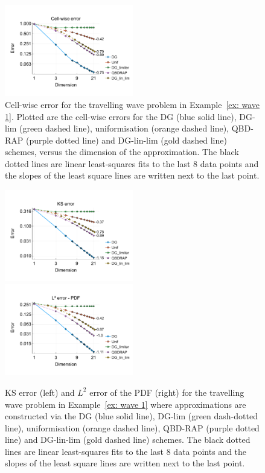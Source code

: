 \begin{example}
	\begin{figure}[h]
		\centering
		\includegraphics[width=0.5\textwidth,trim={0.75cm 0.8cm 0.25cm 1.25cm},clip]{chapter6/figs/wave/fun1/L1_cell_probs.pdf} 
		\caption{Cell-wise error for the travelling wave problem in Example~\ref{ex: wave 1}. Plotted are the cell-wise errors for the DG (blue solid line), DG-lim (green dashed line), uniformisation (orange dashed line), QBD-RAP (purple dotted line) and DG-lin-lim (gold dashed line) schemes, versus the dimension of the approximation. The black dotted lines are linear least-squares fits to the last 8 data points and the slopes of the least square lines are written next to the last point.}  
		\label{fig: fun 1 wave cp}  
	\end{figure}
	\begin{figure}[h]
		\centering
		\includegraphics[width=0.5\textwidth,trim={0.75cm 0.8cm 0.25cm 1.25cm},clip]{chapter6/figs/wave/fun1/meshs_ks_error_formatted.pdf}%
		\includegraphics[width=0.5\textwidth,trim={0.75cm 0.8cm 0.25cm 1.25cm},clip]{chapter6/figs/wave/fun1/meshs_l2_pdf_error_formatted.pdf}
		\caption{KS error (left) and \(L^2\) error of the PDF (right) for the travelling wave problem in Example~\ref{ex: wave 1} where approximations are constructed via the DG (blue solid line), DG-lim (green dash-dotted line), uniformisation (orange dashed line), QBD-RAP (purple dotted line) and DG-lin-lim (gold dashed line) schemes. The black dotted lines are linear least-squares fits to the last 8 data points and the slopes of the least square lines are written next to the last point.} 

\end{figure}
\end{example}

